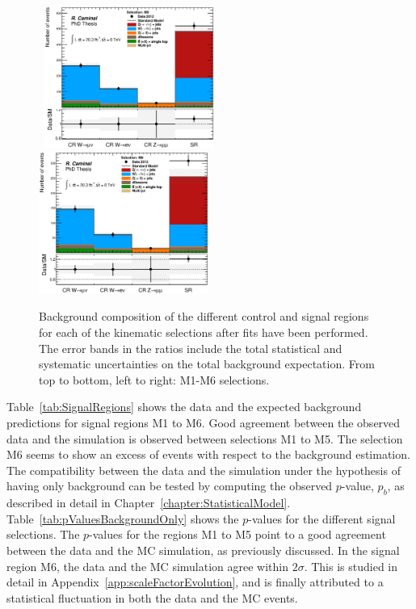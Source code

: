 \begin{figure}[!ht]
\begin{center}
{    }
    \mbox{
      \includegraphics[width=0.495\textwidth]{MonojetAnalysis/Figures/regionsComposition_Stop_M5.eps}
      \includegraphics[width=0.495\textwidth]{MonojetAnalysis/Figures/regionsComposition_Stop_M6.eps}
    }
  \end{center}
  \caption[Background composition of the different control and signal regions for each of the kinematic selections after fits have been performed.]{Background composition of the different control and signal regions for each of the kinematic selections after fits have been performed. The error bands in the ratios include the total statistical and systematic uncertainties on the total background expectation. From top to bottom, left to right: M1-M6 selections.}
  \label{fig:RegionsComposition}
\end{figure}

Table~\ref{tab:SignalRegions} shows the data and the expected background predictions for signal regions M1 to M6.
Good agreement between the observed data and the simulation is observed between selections M1 to M5.
The selection M6 seems to show an excess of events with respect to the background estimation.
The compatibility between the data and the simulation under the hypothesis of having only background can be tested by computing the observed $p$-value, $p_b$, as described in detail in Chapter~\ref{chapter:StatisticalModel}.
Table~\ref{tab:pValuesBackgroundOnly} shows the $p$-values for the different signal selections.
The $p$-values for the regions M1 to M5 point to a good agreement between the data and the MC simulation, as previously discussed.
In the signal region M6, the data and the MC simulation agree within $2\sigma$.
This is studied in detail in Appendix~\ref{app:scaleFactorEvolution}, and is finally attributed to a statistical fluctuation in both the data and the MC events.

